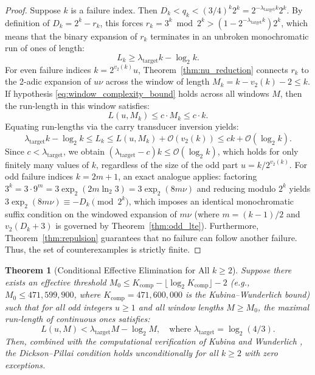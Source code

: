\documentclass[11pt,reqno]{amsart}
\newtheorem{theorem}{Theorem}[section]
\theoremstyle{definition}
\numberwithin{equation}{section}
\begin{document}
\begin{proof}
Suppose $k$ is a failure index. Then $D_k < q_k < (3/4)^k 2^k = 2^{-\lambda_{\mathrm{target}} k} 2^k$.
By definition of $D_k = 2^k - r_k$, this forces $r_k = 3^k \bmod 2^k > (1 - 2^{-\lambda_{\mathrm{target}} k}) 2^k$, which means that the binary expansion of $r_k$ terminates in an unbroken monochromatic run of ones of length:
\[
L_k \ge \lambda_{\mathrm{target}} k - \log_2 k.
\]
For even failure indices $k = 2^{v_2(k)} u$, Theorem~\ref{thm:nu_reduction} connects $r_k$ to the 2-adic expansion of $u \nu$ across the window of length $M_k = k - v_2(k) - 2 \le k$.
If hypothesis \eqref{eq:window_complexity_bound} holds across all windows $M$, then the run-length in this window satisfies:
\[
L(u, M_k) \le c \cdot M_k \le c \cdot k.
\]
Equating run-lengths via the carry transducer inversion yields:
\[
\lambda_{\mathrm{target}} k - \log_2 k \le L_k \le L(u, M_k) + \mathcal{O}(v_2(k)) \le c k + \mathcal{O}(\log_2 k).
\]
Since $c < \lambda_{\mathrm{target}}$, we obtain $(\lambda_{\mathrm{target}} - c) k \le \mathcal{O}(\log_2 k)$, which holds for only finitely many values of $k$, regardless of the size of the odd part $u = k / 2^{v_2(k)}$.
For odd failure indices $k = 2m + 1$, an exact analogue applies: factoring $3^k = 3 \cdot 9^m = 3 \exp_2(2m \ln_2 3) = 3 \exp_2(8m \nu)$ and reducing modulo $2^k$ yields $3 \exp_2(8m \nu) \equiv -D_k \pmod{2^k}$, which imposes an identical monochromatic suffix condition on the windowed expansion of $m \nu$ (where $m = (k - 1)/2$ and $v_2(D_k + 3)$ is governed by Theorem~\ref{thm:odd_lte}). Furthermore, Theorem~\ref{thm:repulsion} guarantees that no failure can follow another failure. Thus, the set of counterexamples is strictly finite.
\end{proof}

\begin{theorem}[Conditional Effective Elimination for All $k \ge 2$]\label{thm:conditional_effective}
Suppose there exists an effective threshold $M_0 \le K_{\mathrm{comp}} - \lfloor \log_2 K_{\mathrm{comp}} \rfloor - 2$ (e.g., $M_0 \le 471{,}599{,}900$, where $K_{\mathrm{comp}} = 471{,}600{,}000$ is the Kubina--Wunderlich bound) such that for all odd integers $u \ge 1$ and all window lengths $M \ge M_0$, the maximal run-length of continuous ones satisfies:
\begin{equation}\label{eq:effective_hypothesis}
L(u, M) < \lambda_{\mathrm{target}} M - \log_2 M, \quad \text{where } \lambda_{\mathrm{target}} = \log_2(4/3).
\end{equation}
Then, combined with the computational verification of Kubina and Wunderlich \cite{kubina1990}, the Dickson--Pillai condition holds unconditionally for all $k \ge 2$ with zero exceptions.
\end{theorem}
\end{document}
